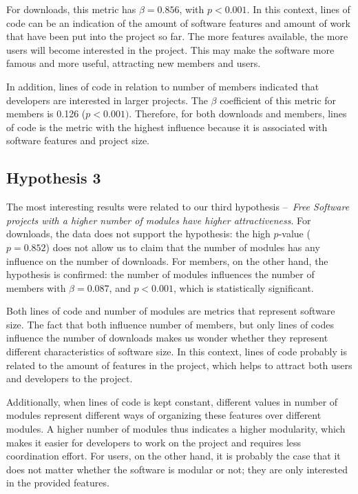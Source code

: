 \documentclass[conference]{IEEEtran}
\begin{document}
For downloads, this metric has $\beta = 0.856$, with $p<0.001$.
%
In this context, lines of code can be an indication of the amount of
software features and amount of work that have been put into the project so far.
%
The more features available, the more users will become interested in the project.
%
This may make the software more famous and more useful, attracting new members and users.


In addition, lines of code in relation to number of members indicated that
developers are interested in larger projects. The $\beta$ coefficient of
this metric for members is 0.126 ($p<0.001)$.
%
Therefore, for both downloads and members, lines of code is the metric with
the highest influence because it is associated with software features and project size.

\subsection{Hypothesis 3}

The most interesting results were related to our third hypothesis
--~\emph{Free Software projects with a higher number of modules have
higher attractiveness}.
%
For downloads, the data does not support the hypothesis: the high
$p$-value ( $p= 0.852$) does not allow us to claim that the number of
modules has any influence on the number of downloads.
%
For members, on the other hand, the hypothesis is confirmed: the number of modules
influences the number of members with $\beta = 0.087$, and $p<0.001$, which is
statistically significant.

Both lines of code and number of modules are metrics that represent software
size. The fact that both influence number of members, but only lines of codes
influence the number of downloads makes us wonder whether they represent
different characteristics of software size.
%
In this context, lines of code probably is related to the amount of features in the project, 
which helps to attract both users and developers to the project.


Additionally, when lines of code is kept constant, different values in
number of modules represent different ways of organizing these features over
different modules.
%
A higher number of modules thus indicates a higher modularity, which makes
it easier for developers to work on the project and requires less
coordination effort.
%
For users, on the other hand, it is probably the case that it does not matter
whether the software is modular or not; they are only interested in the provided features.
\end{document}
